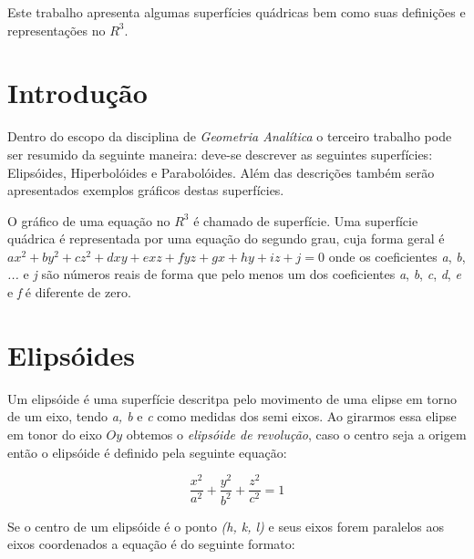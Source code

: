 \documentclass[
	article,			%
	11pt,				%
	oneside,			%
	a4paper,			%
	english,			%
	brazil,				%
	]{abntex2}
\begin{document}
\frenchspacing 

\maketitle

\begin{resumoumacoluna}
    
		Este trabalho apresenta algumas superfícies quádricas bem como suas
		definições e representações no $R^3$.

 \vspace{\onelineskip}
 
 \noindent
\end{resumoumacoluna}

\textual

    \section*{Introdução}

		Dentro do escopo da disciplina de \emph{Geometria Analítica} o terceiro
		trabalho pode ser resumido da seguinte maneira: deve-se descrever as
		seguintes superfícies:  Elipsóides, Hiperbolóides e Parabolóides. Além
		das descrições também serão apresentados exemplos gráficos destas
		superfícies.

		O gráfico de uma equação no $R^3$ é chamado de superfície. Uma
		superfície quádrica é representada por uma equação do segundo grau, cuja
		forma geral é $ ax^2 + by^2 + cz^2 + dxy + exz + fyz + gx + hy + iz + j
		= 0$ onde os coeficientes \emph{a}, \emph{b}, \emph{...} e \emph{j} são
		números reais de forma que pelo menos um dos coeficientes \emph{a},
		\emph{b}, \emph{c}, \emph{d}, \emph{e} e \emph{f} é diferente de zero.

    \section{Elipsóides}

		Um elipsóide é uma superfície descritpa pelo movimento de uma elipse em
		torno de um eixo, tendo \emph{a, b} e \emph{c} como medidas dos semi
		eixos. Ao girarmos essa elipse em tonor do eixo $Oy$ obtemos o
		\emph{elipsóide de revolução}, caso o centro seja a origem então o
		elipsóide é definido pela seguinte equação:

			$$\frac{x^2}{a^2}+\frac{y^2}{b^2}+\frac{z^2}{c^2}=1$$

		Se o centro de um elipsóide é o ponto \emph{(h, k, l)} e seus eixos
		forem paralelos aos eixos coordenados a equação é do seguinte formato:
\end{document}
